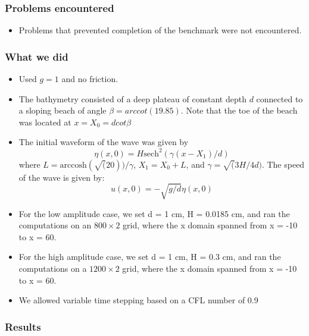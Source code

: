 \subsubsection{Problems encountered}

\begin{itemize}
\item Problems that prevented completion of the benchmark were not encountered.
\end {itemize}

\subsubsection{What we did}

\begin{itemize}
\item Used $g=1$ and no friction.
\item The bathymetry consisted of a deep plateau of constant depth $d$ connected to a sloping beach of angle $\beta = arccot(19.85)$. Note that the toe of the beach was located at $x = X_0 = d cot \beta$
\item The initial waveform of the wave was given by 
\begin{equation}
\eta(x,0) = H \text{sech}^2(\gamma (x - X_1)/d)
\end{equation}
where $L = \text{arccosh}(\sqrt(20))/\gamma$, $X_1 = X_0 + L$, 
and $\gamma = \sqrt(3H/4d)$. The speed of the wave is given by: 
\begin{equation}
u(x,0)=-\sqrt{g/d}\eta(x,0)
\end{equation}
\item For the low amplitude case, we set d = 1 cm, H = 0.0185 cm, and ran the computations on an $800\times 2$ grid, where the x domain spanned from x = -10 to x = 60.
\item For the high amplitude case, we set d = 1 cm, H = 0.3 cm, and ran the computations on a $1200\times 2$ grid, where the x domain spanned from x = -10 to x = 60.
\item We allowed variable time stepping based on a CFL number of 0.9
\end{itemize} 

\subsubsection{Results}

